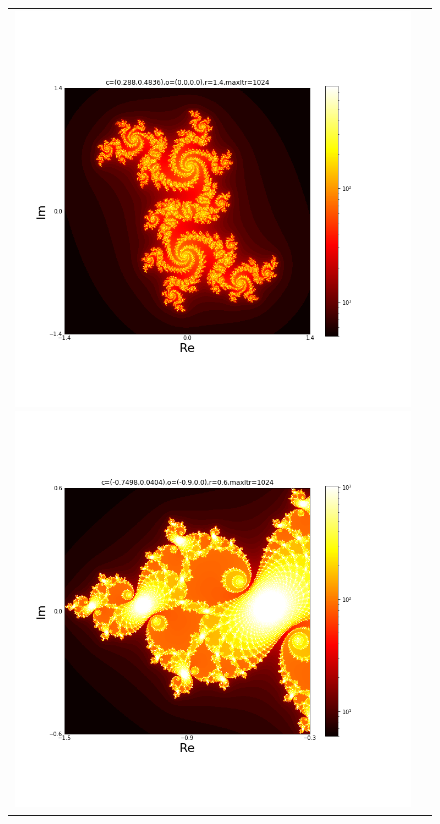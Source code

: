 \documentclass[uplatex,a4paper,11pt,oneside,openany]{jsbook}
\begin{document}
\begin{figure}[H]
  \centering
  \begin{tabular}{cc}
      \begin{minipage}{0.5\hsize}
      \centering
\includegraphics[bb=35 100 650 600,keepaspectratio,clip,scale=0.35]{../src/figure/julia004.png}
      \end{minipage}
      \begin{minipage}{0.5\hsize}
      \centering
\includegraphics[bb=35 100 650 600,keepaspectratio,clip,scale=0.35]{../src/figure/julia003.png}
      \end{minipage}
    \end{tabular}
\end{figure}%
\end{document}
